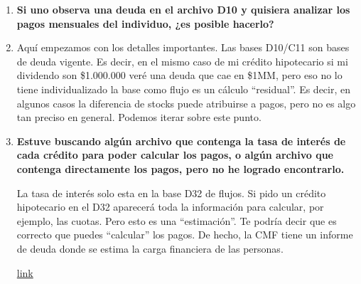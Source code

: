 \documentclass[12pt]{article}
\theoremstyle{plain}
\theoremstyle{plain}
\theoremstyle{definition}  %
\theoremstyle{remark}  %
\begin{document}
\begin{enumerate}
Luego vienen dos bases de stocks. Las principales son D10 y C11. Estas reflejan en general todas las deudas vigentes de créditos de consumo, comerciales e hipotecarios. Cual es la diferencia con la base de flujos: aquí se muestra mes a mes la deuda vigente de cada persona/firme hasta que se extingan sus obligaciones. En el mismo ejemplo anterior del crédito hipotecario, mientras que en flujos tendrás solo 1 observación el mes de otorgación del crédito, en stocks tendrás 30 años (de forma mensual) con la deuda vigente (al día y en mora) de ese cliente, en caso de un pago normal del cliente. Siempre tendrás que el numero de observaciones de stock será muy superior a flujos, es normal esto en estas bases lo cual es consistente ya que reflejan información complementaria.

No quiero por el momento complicar con como se cruzan ambas bases (y todas la limitaciones asociadas), pero puedo ir a más detalles según tus consultas.

Pero en general, ambas bases te permiten ver las condiciones de origen y la deuda vigente en el tiempo asociada a ese crédito.

\item \textbf{Si uno observa una deuda en el archivo D10 y quisiera analizar los pagos mensuales del individuo, ¿es posible hacerlo?}
\item 
Aquí empezamos con los detalles importantes. Las bases D10/C11 son bases de deuda vigente. Es decir, en el mismo caso de mi crédito hipotecario si mi dividendo son \$1.000.000 veré una deuda que cae en \$1MM, pero eso no lo tiene individualizado la base como flujo es un cálculo “residual”. Es decir, en algunos casos la diferencia de stocks puede atribuirse a pagos, pero no es algo tan preciso en general. Podemos iterar sobre este punto.

\item \textbf{Estuve buscando algún archivo que contenga la tasa de interés de cada crédito para poder calcular los pagos, o algún archivo que contenga directamente los pagos, pero no he logrado encontrarlo.}

La tasa de interés solo esta en la base D32 de flujos. Si pido un crédito hipotecario en el D32 aparecerá toda la información para calcular, por ejemplo, las cuotas. Pero esto es una “estimación”. Te podría decir que es correcto que puedes “calcular” los pagos. De hecho, la CMF tiene un informe de deuda donde se estima la carga financiera de las personas.

\href{https://www.cmfchile.cl/portal/estadisticas/617/articles-102985_doc_pdf.pdf}{link}



\end{enumerate}
\end{document}
